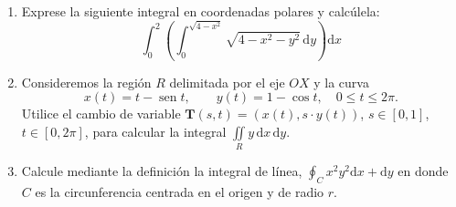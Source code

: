 \begin{enumerate}
\item Exprese la siguiente integral en coordenadas polares y calcúlela:
\[
\int_0^2\left(\int_0^{\sqrt{4-x^2}} \sqrt{4-x^2-y^2}\,\mathrm dy\right)\mathrm dx
\]




\item
Consideremos la región $R$ delimitada por el eje $OX$ y la curva
\[
x(t)=t-\operatorname{sen} t,\qquad y(t)= 1-\cos t,\quad 0\leq t\leq 2\pi.
\]
Utilice el cambio de variable $\boldsymbol{T}(s,t)=(x(t),s\cdot y(t))$, $s\in[0,1]$, $t\in [0,2\pi]$, para calcular la integral $\displaystyle\iint\limits_R y\,\mathrm dx\,\mathrm dy$.


\item Calcule mediante la definición la integral de línea, $\displaystyle\oint_C
x^2y^2\mathrm dx+\mathrm dy$ en donde $C$ es la circunferencia centrada en el origen y de radio $r$.


\end{enumerate}

\newpage

\ 

\endinput





